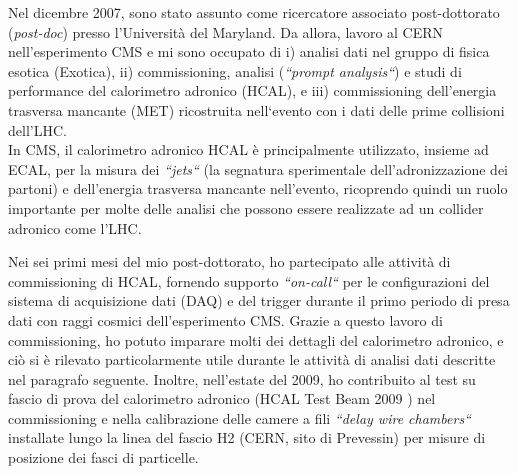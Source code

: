 \documentclass[10pt, a4paper]{article}
\begin{document}
Nel dicembre 2007, sono stato assunto come ricercatore associato post-dottorato ({\it post-doc}) presso 
l'Universit\`a del Maryland. Da allora, lavoro al CERN nell'esperimento CMS e mi sono occupato di i) analisi dati 
nel gruppo di fisica esotica (Exotica), ii) commissioning, analisi ({\it``prompt analysis``}) e studi di performance 
del calorimetro adronico (HCAL), e iii) commissioning dell'energia trasversa mancante (MET) ricostruita 
nell`evento con i dati delle prime collisioni dell'LHC. \\

In CMS, il calorimetro adronico HCAL \`e principalmente utilizzato, insieme ad ECAL, per la misura dei 
{\it ``jets``} (la segnatura sperimentale dell'adronizzazione dei partoni) 
e dell'energia trasversa mancante nell'evento, ricoprendo quindi un ruolo importante per molte delle 
analisi che possono essere realizzate ad un collider adronico come l'LHC. 

Nei sei primi mesi del mio 
post-dottorato, ho partecipato alle attivit\`a di commissioning di HCAL, fornendo supporto {\it ``on-call``} 
per le configurazioni del sistema di acquisizione dati (DAQ) e del trigger durante il primo periodo di presa dati 
con raggi cosmici dell'esperimento CMS. Grazie a questo lavoro di commissioning, ho potuto imparare molti dei dettagli del calorimetro 
adronico, e ci\`o si \`e rilevato particolarmente utile durante le attivit\`a di analisi dati descritte nel paragrafo seguente. 
Inoltre, nell'estate del 2009, ho contribuito al test su fascio di prova del 
calorimetro adronico (HCAL Test Beam 2009 \cite{Chatrchyan:2010zz}) nel commissioning e 
nella calibrazione delle camere a fili  {\it ``delay wire chambers``} installate lungo la linea del fascio 
H2 (CERN, sito di Prevessin) per misure di posizione dei fasci di particelle. \\
\end{document}
